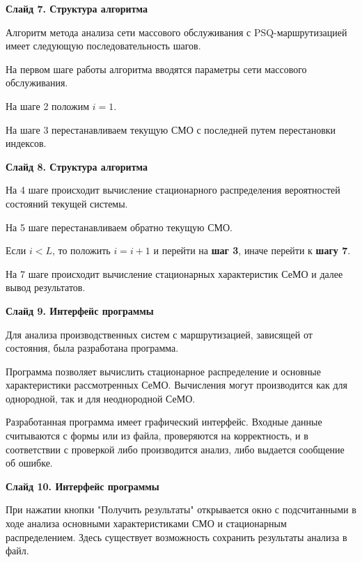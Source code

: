 \documentclass[a4paper,14pt]{extarticle}
\theoremstyle{note}
\begin{document}
\textbf{Слайд 7. Структура алгоритма}

Алгоритм метода анализа сети массового обслуживания с PSQ-маршрутизацией имеет следующую последовательность шагов.

На первом шаге работы алгоритма вводятся параметры сети массового обслуживания.

На шаге 2 положим $i = 1$.

На шаге 3 перестанавливаем текущую СМО с последней путем перестановки индексов.


\textbf{Слайд 8. Структура алгоритма}

На 4 шаге происходит вычисление стационарного распределения вероятностей состояний текущей системы.

На 5 шаге перестанавливаем обратно текущую СМО.

Если $i < L$, то положить $i=i+1$ и перейти на \textbf{шаг 3}, иначе перейти к \textbf{шагу 7}.

На 7 шаге происходит вычисление стационарных характеристик СеМО и далее вывод результатов.


\textbf{Слайд 9. Интерфейс программы}

Для анализа производственных систем с маршрутизацией, зависящей от состояния, была разработана программа.

Программа позволяет вычислить стационарное распределение и основные характеристики рассмотренных СеМО. Вычисления могут производится как для однородной, так и для неоднородной СеМО.

Разработанная программа имеет графический интерфейс. Входные данные считываются с формы или из файла, проверяются на корректность, и в соответствии с проверкой либо производится анализ, либо выдается сообщение об ошибке.


\textbf{Слайд 10. Интерфейс программы}

При нажатии кнопки "Получить результаты" открывается окно с подсчитанными в ходе анализа основными характеристиками СМО и стационарным распределением. Здесь существует возможность сохранить результаты анализа в файл.

\end{document}
